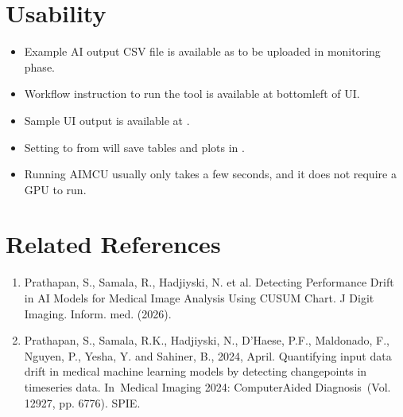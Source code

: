 \documentclass[letterpaper,10pt,oneside,english]{sphinxmanual}
\begin{document}
\chapter{Usability}
\label{\detokenize{index:usability}}\begin{itemize}
\item {} 
\sphinxAtStartPar
Example AI output CSV file is available as  to be uploaded in monitoring phase.

\item {} 
\sphinxAtStartPar
Workflow instruction to run the tool is available at bottom\sphinxhyphen{}left of UI.

\item {} 
\sphinxAtStartPar
Sample UI output is available at .

\item {} 
\sphinxAtStartPar
Setting  to  from  will save tables and plots in .

\item {} 
\sphinxAtStartPar
Running AIM\sphinxhyphen{}CU usually only takes a few seconds, and it does not require a GPU to run.

\end{itemize}


\chapter{Related References}
\label{\detokenize{index:related-references}}\begin{enumerate}
%
\item {} 
\sphinxAtStartPar
Prathapan, S., Samala, R., Hadjiyski, N. et al. Detecting Performance Drift in AI Models for Medical Image Analysis Using CUSUM Chart. J Digit Imaging. Inform. med. (2026). 

\item {} 
\sphinxAtStartPar
Prathapan, S., Samala, R.K., Hadjiyski, N., D’Haese, P.F., Maldonado, F., Nguyen, P., Yesha, Y. and Sahiner, B., 2024, April. Quantifying input data drift in medical machine learning models by detecting change\sphinxhyphen{}points in time\sphinxhyphen{}series data. In Medical Imaging 2024: Computer\sphinxhyphen{}Aided Diagnosis (Vol. 12927, pp. 67\sphinxhyphen{}76). SPIE. 

\end{enumerate}
\end{document}
